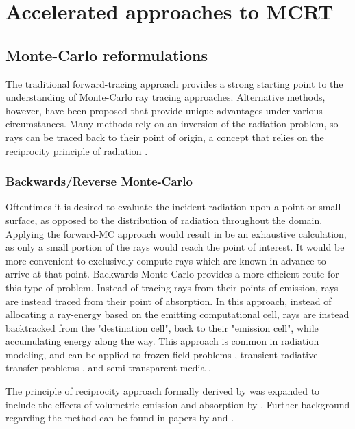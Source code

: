 \section{Accelerated approaches to MCRT}

\subsection{Monte-Carlo reformulations}
The traditional forward-tracing approach provides a strong starting point to the understanding of Monte-Carlo ray tracing approaches. Alternative methods, however, have been proposed that provide unique advantages under various circumstances.
Many methods rely on an inversion of the radiation problem, so rays can be traced back to their point of origin, a concept that relies on the reciprocity principle of radiation \cite{Case1957TransferPrinciple}.

\subsubsection{Backwards/Reverse Monte-Carlo}
Oftentimes it is desired to evaluate the incident radiation upon a point or small surface, as opposed to the distribution of radiation throughout the domain.
Applying the forward-MC approach would result in be an exhaustive calculation, as only a small portion of the rays would reach the point of interest. It would be more convenient to exclusively compute rays which are known in advance to arrive at that point. 
Backwards Monte-Carlo provides a more efficient route for this type of problem.
Instead of tracing rays from their points of emission, rays are instead traced from their point of absorption.
In this approach, instead of allocating a ray-energy based on the emitting computational cell, rays are instead backtracked from the "destination cell", back to their "emission cell", while accumulating energy along the way.
This approach is common in radiation modeling, and can be applied to frozen-field problems \cite{}, transient radiative transfer problems \cite{Lu2004ReverseMedia}, and semi-transparent media \cite{Li2005BackwardSlab}.

The principle of reciprocity approach formally derived by \citet{Case1957TransferPrinciple} was expanded to include the effects of volumetric emission and absorption by \citet{Walters1992RigorousMedia}.
Further background regarding the method can be found in papers by \citet{Modest2003BackwardTransfer} and \citet{Howell2010ThermalTransfer}.


